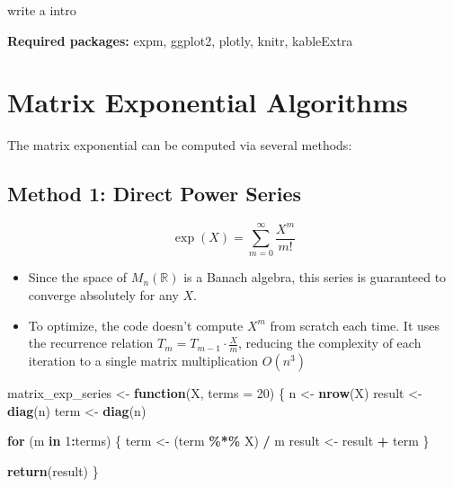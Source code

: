 \documentclass[
]{book}
\newenvironment{Shaded}{\begin{snugshade}}{\end{snugshade}}
\newcommand{\AttributeTok}[1]{\textcolor[rgb]{0.13,0.29,0.53}{#1}}
\newcommand{\ControlFlowTok}[1]{\textcolor[rgb]{0.13,0.29,0.53}{\textbf{#1}}}
\newcommand{\DecValTok}[1]{\textcolor[rgb]{0.00,0.00,0.81}{#1}}
\newcommand{\FunctionTok}[1]{\textcolor[rgb]{0.13,0.29,0.53}{\textbf{#1}}}
\newcommand{\NormalTok}[1]{#1}
\newcommand{\OtherTok}[1]{\textcolor[rgb]{0.56,0.35,0.01}{#1}}
\newcommand{\SpecialCharTok}[1]{\textcolor[rgb]{0.81,0.36,0.00}{\textbf{#1}}}
\providecommand{\tightlist}{%
  \setlength{\itemsep}{0pt}\setlength{\parskip}{0pt}}
\theoremstyle{definition}
\theoremstyle{definition}
\theoremstyle{definition}
\theoremstyle{definition}
\theoremstyle{remark}
\begin{document}
write a intro

\textbf{Required packages:} expm, ggplot2, plotly, knitr, kableExtra

\section{Matrix Exponential Algorithms}\label{matrix-exponential-algorithms}

The matrix exponential can be computed via several methods:

\subsection{Method 1: Direct Power Series}\label{method-1-direct-power-series}

\[\exp(X) = \sum_{m=0}^{\infty} \frac{X^m}{m!}\]

\begin{itemize}
\tightlist
\item
  Since the space of \(M_n(\mathbb{R})\) is a Banach algebra, this series is guaranteed to converge absolutely for any \(X\).
\item
  To optimize, the code doesn't compute \(X^m\) from scratch each time. It uses the recurrence relation \(T_m = T_{m-1} \cdot \frac{X}{m}\), reducing the complexity of each iteration to a single matrix multiplication \(O(n^3)\)
\end{itemize}

\begin{Shaded}
\begin{Highlighting}[]
\NormalTok{matrix\_exp\_series }\OtherTok{\textless{}{-}} \ControlFlowTok{function}\NormalTok{(X, }\AttributeTok{terms =} \DecValTok{20}\NormalTok{) \{}
\NormalTok{  n }\OtherTok{\textless{}{-}} \FunctionTok{nrow}\NormalTok{(X)}
\NormalTok{  result }\OtherTok{\textless{}{-}} \FunctionTok{diag}\NormalTok{(n)}
\NormalTok{  term }\OtherTok{\textless{}{-}} \FunctionTok{diag}\NormalTok{(n)}
  
  \ControlFlowTok{for}\NormalTok{ (m }\ControlFlowTok{in} \DecValTok{1}\SpecialCharTok{:}\NormalTok{terms) \{}
\NormalTok{    term }\OtherTok{\textless{}{-}}\NormalTok{ (term }\SpecialCharTok{\%*\%}\NormalTok{ X) }\SpecialCharTok{/}\NormalTok{ m}
\NormalTok{    result }\OtherTok{\textless{}{-}}\NormalTok{ result }\SpecialCharTok{+}\NormalTok{ term}
\NormalTok{  \}}
  
  \FunctionTok{return}\NormalTok{(result)}
\NormalTok{\}}
\end{Highlighting}
\end{Shaded}
\end{document}
